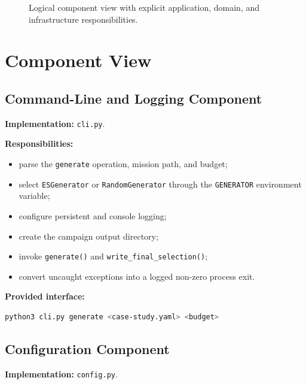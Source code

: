 \documentclass[11pt,a4paper,openany]{report}
\newcommand{\code}[1]{\texttt{#1}}
\begin{document}
\begin{figure}[H]
{%
}
\caption{Logical component view with explicit application, domain, and infrastructure responsibilities.}
\label{fig:components}
\end{figure}

\section{Component View}

\subsection{Command-Line and Logging Component}
\textbf{Implementation:} \code{cli.py}.

\textbf{Responsibilities:}
\begin{itemize}
  \item parse the \code{generate} operation, mission path, and budget;
  \item select \code{ESGenerator} or \code{RandomGenerator} through the \code{GENERATOR} environment variable;
  \item configure persistent and console logging;
  \item create the campaign output directory;
  \item invoke \code{generate()} and \code{write\_final\_selection()};
  \item convert uncaught exceptions into a logged non-zero process exit.
\end{itemize}

\textbf{Provided interface:}
\begin{lstlisting}[language=bash]
python3 cli.py generate <case-study.yaml> <budget>
\end{lstlisting}

\subsection{Configuration Component}
\textbf{Implementation:} \code{config.py}.
\end{document}
